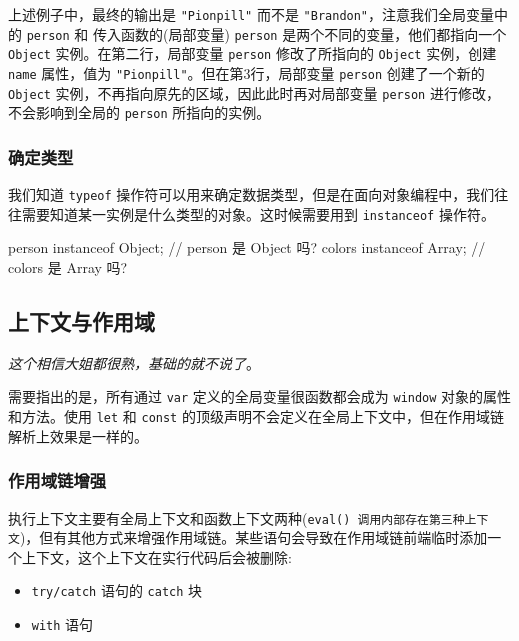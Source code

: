 上述例子中，最终的输出是 \texttt{"Pionpill"} 而不是 \texttt{"Brandon"}，注意我们全局变量中的 \texttt{person} 和 传入函数的(局部变量) \texttt{person} 是两个不同的变量，他们都指向一个 \texttt{Object} 实例。在第二行，局部变量 \texttt{person} 修改了所指向的 \texttt{Object} 实例，创建 \texttt{name} 属性，值为 \texttt{"Pionpill"}。但在第3行，局部变量 \texttt{person} 创建了一个新的 \texttt{Object} 实例，不再指向原先的区域，因此此时再对局部变量 \texttt{person} 进行修改，不会影响到全局的 \texttt{person} 所指向的实例。


\subsubsection{确定类型}

我们知道 \texttt{typeof} 操作符可以用来确定数据类型，但是在面向对象编程中，我们往往需要知道某一实例是什么类型的对象。这时候需要用到 \texttt{instanceof} 操作符。 

\begin{JavaScript}
person instanceof Object;   // person 是 Object 吗?
colors instanceof Array;    // colors 是 Array 吗?
\end{JavaScript}


\subsection{上下文与作用域}

\textit{这个相信大姐都很熟，基础的就不说了}。

需要指出的是，所有通过 \texttt{var} 定义的全局变量很函数都会成为 \texttt{window} 对象的属性和方法。使用 \texttt{let} 和 \texttt{const} 的顶级声明不会定义在全局上下文中，但在作用域链解析上效果是一样的。

\subsubsection{作用域链增强}

执行上下文主要有全局上下文和函数上下文两种(\texttt{eval() 调用内部存在第三种上下文})，但有其他方式来增强作用域链。某些语句会导致在作用域链前端临时添加一个上下文，这个上下文在实行代码后会被删除:
\begin{itemize}
    \item \texttt{try/catch} 语句的 \texttt{catch} 块
    \item \texttt{with} 语句
\end{itemize}